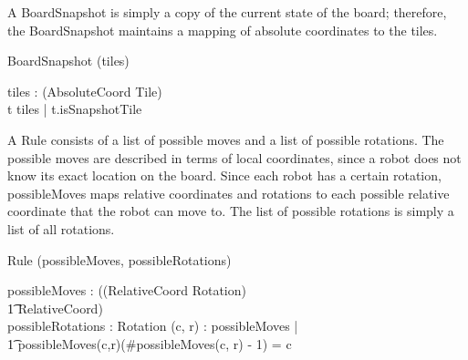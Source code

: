 A BoardSnapshot is simply a copy of the current state of the board; therefore, the BoardSnapshot maintains a mapping of absolute coordinates to the tiles.
\begin{class}{BoardSnapshot}
\upharpoonright (tiles) \\
\begin{state}
tiles : \power (AbsoluteCoord \fun Tile) \\
\where
\forall t \ran tiles | t.isSnapshotTile
\end{state}
\end{class}

A Rule consists of a list of possible moves and a list of possible rotations. The possible moves are described in terms of local coordinates, since a robot does not know its exact location on the board. Since each robot has a certain rotation, possibleMoves maps relative coordinates and rotations to each possible relative coordinate that the robot can move to. The list of possible rotations is simply a list of all rotations.
\begin{class}{Rule}
\upharpoonright (possibleMoves, possibleRotations) \\
\begin{state}
possibleMoves : \power ((RelativeCoord \times Rotation) \psurj \\ \t1 \seq RelativeCoord) \\
possibleRotations : \power Rotation
\where
\forall (c, r) : \dom possibleMoves | \\ \t1 possibleMoves(c,r)(\#possibleMoves(c, r) - 1) = c
\end{state} \\
\end{class}

